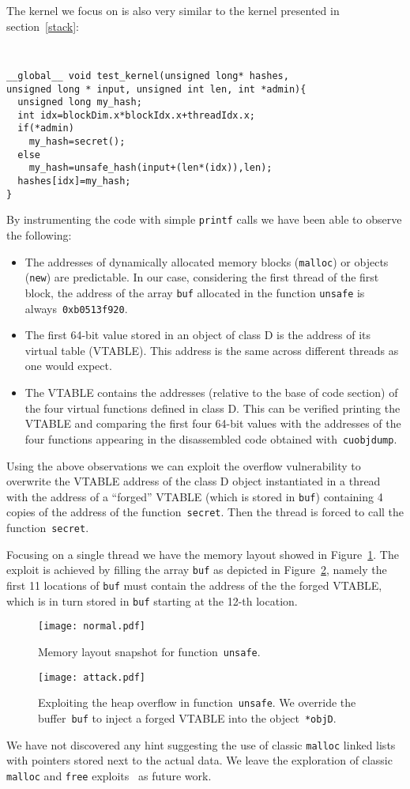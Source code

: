 \documentclass[11pt]{llncs}
\begin{document}
The kernel we focus on is also very similar to the kernel presented in section~\ref{stack}:
{\tt \small
\begin{verbatim}
__global__ void test_kernel(unsigned long* hashes,
unsigned long * input, unsigned int len, int *admin){
  unsigned long my_hash;
  int idx=blockDim.x*blockIdx.x+threadIdx.x;
  if(*admin)
    my_hash=secret();
  else
    my_hash=unsafe_hash(input+(len*(idx)),len);
  hashes[idx]=my_hash;
}
\end{verbatim}
}
By instrumenting the code with simple \texttt{printf} calls we have been able to observe the following:
\begin{itemize}
\item The addresses of dynamically allocated memory blocks (\texttt{malloc}) or objects (\texttt{new}) are predictable.
In our case, considering the first thread of the first block, the address of the array \texttt{buf} allocated in the function \texttt{unsafe} is always~\texttt{0xb0513f920}.
\item The first 64-bit value stored in an object of class D is the address of its virtual table (VTABLE). This address is the same across different threads as one would expect.
\item  The VTABLE contains the addresses (relative to the base of code section) of the four virtual functions defined in class D. This can be verified printing the VTABLE and comparing the first four 64-bit values with the addresses
of the four functions appearing in the disassembled code obtained with~\texttt{cuobjdump}.
\end{itemize}
Using the above observations we can exploit the overflow vulnerability to overwrite the VTABLE address of the class D object
instantiated in a thread with the address of a ``forged'' VTABLE (which is stored in \texttt{buf}) containing 4 copies of the address of the function~\texttt{secret}.
Then the thread is forced to call the function~\texttt{secret}.

Focusing on a single thread we have the memory layout showed in Figure~\ref{fig:normal}.   
The exploit is achieved by filling the array \texttt{buf} as depicted in Figure~\ref{fig:attack}, namely the first 11 locations of \texttt{buf} must contain the address of the the forged VTABLE, which is in turn stored in  
\texttt{buf} starting at the 12-th location.
\begin{figure}[!ht]
\centering
\texttt{[image: normal.pdf]}
\caption{Memory layout snapshot for function~\texttt{unsafe}.}\label{fig:normal}
\end{figure}
\begin{figure}[!ht]
\centering
\texttt{[image: attack.pdf]}
\caption{Exploiting the heap overflow in function~\texttt{unsafe}. We override the buffer~\texttt{buf} to inject a forged VTABLE into the object~\texttt{*objD}.}\label{fig:attack}
\end{figure}
We have not discovered any hint suggesting the use of classic \texttt{malloc} linked lists with pointers stored next to the actual data.
We leave the exploration of classic \texttt{malloc} and \texttt{free} exploits~\cite{hof} as future work.
\end{document}
